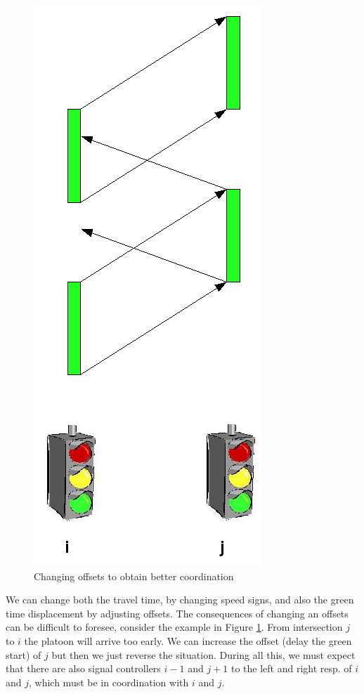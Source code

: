 \begin{figure}[htbp]
\centering
\includegraphics[scale=0.4]{change_offset.png}
\caption{Changing offsets to obtain better coordination}
\label{fig:change_offset}
\end{figure}

We can change both the travel time, by changing speed signs, and also the green time displacement by adjusting offsets. The consequences of changing an offsets can be difficult to foresee, consider the example in Figure \ref{fig:change_offset}. From intersection $j$ to $i$ the platoon will arrive too early. We can increase the offset (delay the green start) of $j$ but then we just reverse the situation. During all this, we must expect that there are also signal controllers $i-1$ and $j+1$ to the left and right resp. of $i$ and $j$, which must be in coordination with $i$ and $j$.

